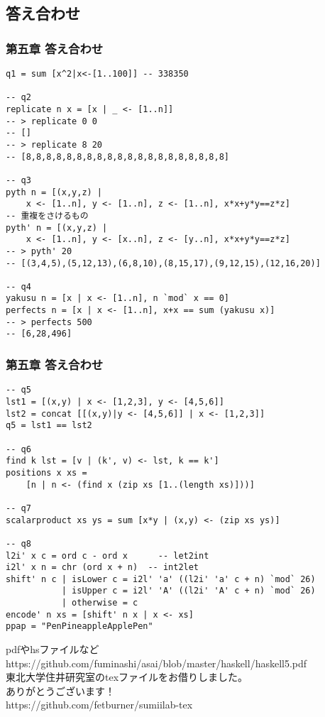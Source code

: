 \documentclass[dvipdfmx,cjk,xcolor=dvipsnames,envcountsect,notheorems,12pt]{beamer}
\theoremstyle{definition}
\begin{document}
\begin{appendix}




\section{答え合わせ}

\begin{frame}[fragile]
  \frametitle{第五章 答え合わせ}
  
\begin{lstlisting}[basicstyle={\ttfamily\scriptsize}]
q1 = sum [x^2|x<-[1..100]] -- 338350

-- q2
replicate n x = [x | _ <- [1..n]]
-- > replicate 0 0
-- []
-- > replicate 8 20
-- [8,8,8,8,8,8,8,8,8,8,8,8,8,8,8,8,8,8,8,8]

-- q3
pyth n = [(x,y,z) |
    x <- [1..n], y <- [1..n], z <- [1..n], x*x+y*y==z*z]
-- 重複をさけるもの
pyth' n = [(x,y,z) | 
    x <- [1..n], y <- [x..n], z <- [y..n], x*x+y*y==z*z]
-- > pyth' 20
-- [(3,4,5),(5,12,13),(6,8,10),(8,15,17),(9,12,15),(12,16,20)]

-- q4
yakusu n = [x | x <- [1..n], n `mod` x == 0]
perfects n = [x | x <- [1..n], x+x == sum (yakusu x)]
-- > perfects 500
-- [6,28,496]
\end{lstlisting}
\end{frame}


\begin{frame}[fragile]
  \frametitle{第五章 答え合わせ}
  
\begin{lstlisting}[basicstyle={\ttfamily\scriptsize}]
-- q5 
lst1 = [(x,y) | x <- [1,2,3], y <- [4,5,6]]
lst2 = concat [[(x,y)|y <- [4,5,6]] | x <- [1,2,3]]
q5 = lst1 == lst2

-- q6
find k lst = [v | (k', v) <- lst, k == k']
positions x xs = 
    [n | n <- (find x (zip xs [1..(length xs)]))]

-- q7
scalarproduct xs ys = sum [x*y | (x,y) <- (zip xs ys)]

-- q8
l2i' x c = ord c - ord x      -- let2int
i2l' x n = chr (ord x + n)  -- int2let
shift' n c | isLower c = i2l' 'a' ((l2i' 'a' c + n) `mod` 26)
           | isUpper c = i2l' 'A' ((l2i' 'A' c + n) `mod` 26)
           | otherwise = c
encode' n xs = [shift' n x | x <- xs]
ppap = "PenPineappleApplePen"
\end{lstlisting}
\end{frame}

\begin{frame}
pdfやhsファイルなど
\\ https://github.com/fuminashi/asai/blob/master/haskell/haskell5.pdf
~
\\東北大学住井研究室のtexファイルをお借りしました。
\\ありがとうございます！
\\ https://github.com/fetburner/sumiilab-tex 
\end{frame}


\end{appendix}
\end{document}
